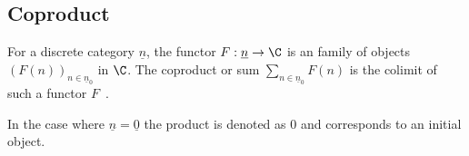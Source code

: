 \subsection{Coproduct}

\begin{definition}[Coproduct]\label{def:coproduct_limit}

	For a discrete category $\underline{n}$, the functor $F:\underline{n}\to \C$
	is an family of objects $(F(n))_{n\in \underline{n}_0}$ in $\C$. The coproduct
	or sum $\sum\limits_{n\in \underline{n}_0} F(n)$ is the colimit of such a
	functor $F$~\parencite[p.~127]{leinster:basic_category_theory}.
\end{definition}

\begin{remark}
	In the case where $\underline{n}=\underline{0}$ the product is denoted as $0$
	and corresponds to an initial object.
\end{remark}

